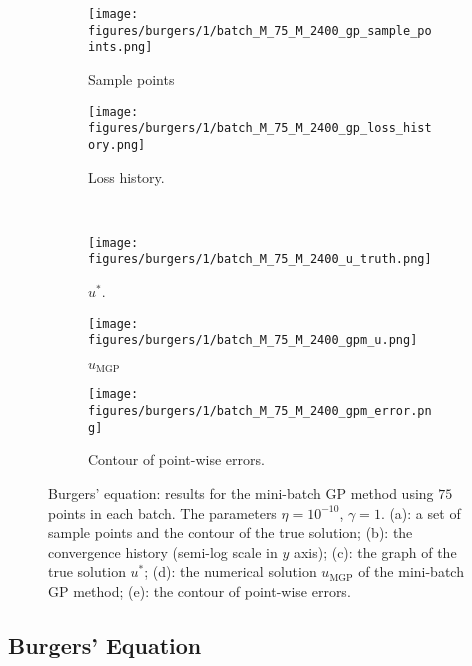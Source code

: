\documentclass[10pt,reqno]{amsart}
\newcommand{\1}{{\chi}}
\numberwithin{equation}{section}
\theoremstyle{thmlemcorr}
\numberwithin{theorem}{section}
\theoremstyle{thmlemcorr*}
\theoremstyle{defi}
\theoremstyle{remexample}
\theoremstyle{ass}
\begin{document}
\begin{figure}[!hbtbp]
	\centering          
	\begin{subfigure}[b]{0.3\textwidth}
		\texttt{[image: figures/burgers/1/batch\_M\_75\_M\_2400\_gp\_sample\_points.png]}
		\caption{Sample points}
		\label{fig:burgers:sp}
	\end{subfigure} 
	\begin{subfigure}[b]{0.3\textwidth}
		\texttt{[image: figures/burgers/1/batch\_M\_75\_M\_2400\_gp\_loss\_history.png]}
		\caption{Loss history.}
		\label{fig:burgers:lshst1}
	\end{subfigure} \\
	\begin{subfigure}[b]{0.3\textwidth}
		\texttt{[image: figures/burgers/1/batch\_M\_75\_M\_2400\_u\_truth.png]}
		\caption{$u^*$.}
		\label{fig:burgers:ustar}
	\end{subfigure} 
	\begin{subfigure}[b]{0.3\textwidth}
		\texttt{[image: figures/burgers/1/batch\_M\_75\_M\_2400\_gpm\_u.png]}
		\caption{$u_{\text{MGP}}$}
		\label{fig:burgers:gpmu}
	\end{subfigure} 
	\begin{subfigure}[b]{0.325\textwidth}
		\texttt{[image: figures/burgers/1/batch\_M\_75\_M\_2400\_gpm\_error.png]}
		\caption{Contour of point-wise errors.}
		\label{fig:burgers:error1}
	\end{subfigure} 
	\caption{Burgers' equation: results for the mini-batch GP method using $75$ points in each batch. The parameters $\eta=10^{-10}$, $\gamma=1$. (a): a set of sample points and the contour of the true solution; (b): the convergence history (semi-log scale in $y$ axis); (c): the graph of the true solution $u^*$; (d): the numerical solution $u_{\text{MGP}}$ of the mini-batch GP method; (e): the contour of point-wise errors. }
	\label{fig:Burgers:1}
\end{figure}
\subsection{Burgers' Equation}
\label{subsecBurg}
\end{document}
